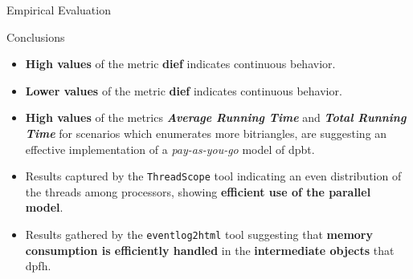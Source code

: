 \begin{frame}[fragile]{Empirical Evaluation}
  \begin{block}{Conclusions}
    \begin{itemize}
      \item {\color{light}\textbf{High values} of the metric \textbf{dief\@t} indicates continuous behavior.}
      \item {\color{light}\textbf{Lower values} of the metric \textbf{dief\@k} indicates continuous behavior.}
      \item {\color{light}\textbf{High values} of the metrics \textbf{\emph{Average Running Time}} and \textbf{\emph{Total Running Time}} for scenarios which enumerates more bitriangles, are suggesting an effective implementation of a \emph{pay-as-you-go} model of \acrshort{dpbt}.}
      \item {\color{light}Results captured by the \texttt{ThreadScope} tool indicating an even distribution of the threads among processors, showing \textbf{efficient use of the parallel model}.}
      \item Results gathered by the \texttt{eventlog2html} tool suggesting that \textbf{memory consumption is efficiently handled} in the \textbf{intermediate objects} that \acrshort{dpfh}.
    \end{itemize} 
  \end{block}
\end{frame}
